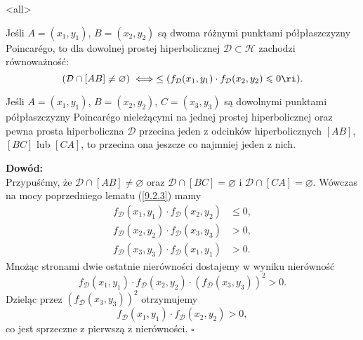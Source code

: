 \mode<all>{}
\begin{frame}[<+->]
\begin{lemat}
\label{9.2.3}
Jeśli $A=(x_{1},y_{1})$, $B=(x_{2},y_{2})$ są dwoma różnymi punktami półpłaszczyzny Poincar\'{e}go, to dla dowolnej prostej hiperbolicznej $\mathcal{D} \subset \mathcal{H}$ zachodzi równoważność:
\[(\mathcal{D}\cap [AB]\neq \varnothing)\iff \le(f_\mathcal{D}(x_{1},y_{1})\cdot 
f_\mathcal{D}(x_{2},y_{2})\leqslant 0\ri).\]
\end{lemat}

\begin{twierdzenie}
Jeśli $A=(x_{1},y_{1})$, $B=(x_{2},y_{2})$, $C=(x_{3},y_{3})$ są dowolnymi punktami półpłaszczyzny Poincar\'{e}go nieleżącymi na jednej prostej hiperbolicznej oraz pewna prosta hiperboliczna $\mathcal{D}$ przecina jeden z odcinków hiperbolicznych $[AB]$, $[BC]$ lub $[CA]$, to przecina ona jeszcze co najmniej jeden z nich.
\end{twierdzenie}

\end{frame}
\begin{frame}
\textcolor{ared}{\textbf{Dowód:}}\\
Przypuśćmy, że $\mathcal{D}\cap [AB]\neq \varnothing$ oraz $\mathcal{D}\cap [BC]=
\varnothing$ i $\mathcal{D}\cap [CA]=\varnothing$. \pause Wówczas na mocy poprzedniego lematu (\ref{9.2.3}) mamy
\begin{align*}
f_\mathcal{D}(x_{1},y_{1})\cdot f_\mathcal{D}(x_{2},y_{2})&\leqslant 0,\\
f_\mathcal{D}(x_{2},y_{2})\cdot f_\mathcal{D}(x_{3},y_{3})&>0,\\
f_\mathcal{D}(x_{3},y_{3})\cdot f_\mathcal{D}(x_{1},y_{1})&>0.
\end{align*}
\pause Mnożąc stronami dwie ostatnie nierówności dostajemy w wyniku nierówność 
\[f_\mathcal{D}(x_{1},y_{1})\cdot f_\mathcal{D}(x_{2},y_{2})\cdot {(f_\mathcal{D}(x_{3},y_{3}))}^{2}>0.\]
\pause Dzieląc przez ${(f_\mathcal{D}(x_{3},y_{3}))}^{2}$ otrzymujemy 
\[f_\mathcal{D}(x_{1},y_{1})\cdot f_\mathcal{D}(x_{2},y_{2})>0,\] co jest sprzeczne z pierwszą z nierówności.
\hfill $\square$
\end{frame}


